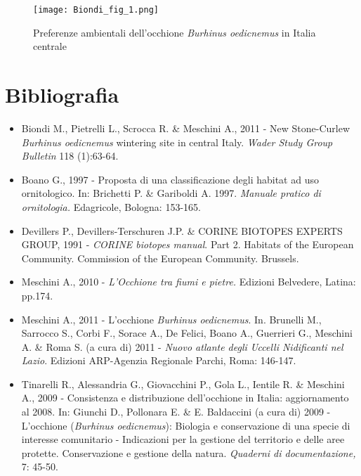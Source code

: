 \begin{adjustwidth}{-3.5cm}{-1cm}
\begin{figure}[!h]
\centering
\texttt{[image: Biondi\_fig\_1.png]}
\caption{Preferenze ambientali dell'occhione \textit{Burhinus oedicnemus} in Italia centrale}
\label{Biondi_fig_1}
\end{figure}
\end{adjustwidth}

\newpage
\section*{Bibliografia}
\begin{itemize}\itemsep0pt
	\item Biondi M., Pietrelli L., Scrocca R. \&  Meschini A., 2011 - New
Stone-Curlew \textit{Burhinus oedicnemus }wintering site in central
Italy. \textit{Wader Study Group Bulletin} 118 (1):63-64.

	\item Boano G., 1997 - Proposta di una classificazione degli habitat ad uso
ornitologico. In: Brichetti P. \& Gariboldi A. 1997. \textit{Manuale
pratico di ornitologia. }Edagricole, Bologna: 153-165.

	\item {Devillers P., Devillers-Terschuren J.P. \& CORINE
BIOTOPES EXPERTS GROUP, 1991 - }\textit{{CORINE
biotopes manual}}{. Part 2. Habitats of the European
Community. Commission of the European Community.
}{Brussels.}

	\item {Meschini A., 2010 -
}\textit{{L{\textquoteright}Occhione tra fiumi e
pietre.}}{ Edizioni Belvedere, Latina: pp.174.}

	\item {Meschini A., 2011 - L{\textquoteright}occhione
}\textit{{Burhinus oedicnemus}}{.
In.} Brunelli M., Sarrocco S., Corbi F., Sorace A., De Felici, Boano
A., Guerrieri G., Meschini A. \& Roma S. (a cura di) 2011 -
\textit{Nuovo atlante degli Uccelli Nidificanti nel Lazio}. Edizioni
ARP-Agenzia Regionale Parchi, Roma: 146-147.

	\item {Tinarelli R., Alessandria G., Giovacchini P., Gola L.,
Ientile R. \& Meschini A., 2009 - Consistenza e distribuzione
dell{\textquoteright}occhione in Italia: aggiornamento al 2008. In:
Giunchi D., Pollonara E. \& E. Baldaccini  (a cura di) 2009 -
L{\textquoteright}occhione (}\textit{{Burhinus
oedicnemus}}{): Biologia e conservazione di una specie
di interesse comunitario - Indicazioni per la gestione del territorio
e delle aree protette. Conservazione e gestione della natura.
}\textit{{Quaderni di
documentazione,}}{ 7: 45-50.}

\end{itemize}
